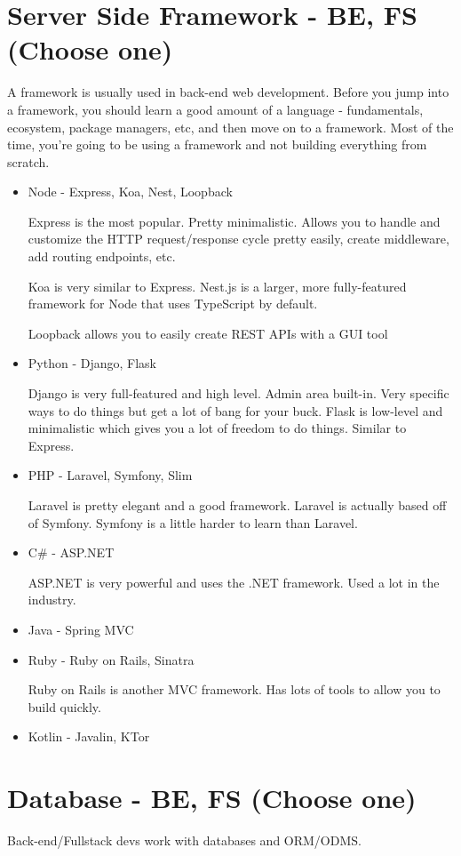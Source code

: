 \section{Server Side Framework - BE, FS \small{(Choose one)}}
A framework is usually used in back-end web development. Before you jump into a framework, you should learn a good amount of a language - fundamentals, ecosystem, package managers, etc, and then move on to a framework. Most of the time, you're going to be using a framework and not building everything from scratch. 

\begin{itemize}
    \item Node - Express, Koa, Nest, Loopback
    
    Express is the most popular. Pretty minimalistic. Allows you to handle and customize the HTTP request/response cycle pretty easily, create middleware, add routing endpoints, etc. 
    
    Koa is very similar to Express. Nest.js is a larger, more fully-featured framework for Node that uses TypeScript by default. 
    
    Loopback allows you to easily create REST APIs with a GUI tool
    \item Python - Django, Flask
    
    Django is very full-featured and high level. Admin area built-in. Very specific ways to do things but get a lot of bang for your buck. Flask is low-level and minimalistic which gives you a lot of freedom to do things. Similar to Express.
    \item PHP - Laravel, Symfony, Slim
    
    Laravel is pretty elegant and a good framework. Laravel is actually based off of Symfony. Symfony is a little harder to learn than Laravel. 
    \item C\# - ASP.NET
    
    ASP.NET is very powerful and uses the .NET framework. Used a lot in the industry.
    \item Java - Spring MVC
    \item Ruby - Ruby on Rails, Sinatra
    
    Ruby on Rails is another MVC framework. Has lots of tools to allow you to build quickly.
    \item Kotlin - Javalin, KTor
\end{itemize}

\section{Database - BE, FS \small{(Choose one)}}
Back-end/Fullstack devs work with databases and ORM/ODMS.

